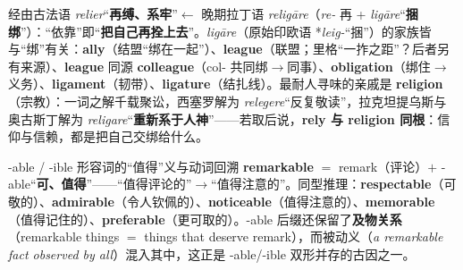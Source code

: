 \documentclass[../main.tex]{subfiles}
\begin{document}


\begin{origin}
经由古法语 \textit{relier}“\textbf{再缚、系牢}”$\leftarrow$ 晚期拉丁语 \textit{religāre}（\textit{re-} 再 + \textit{ligāre}“\textbf{捆绑}”）：“依靠”即“\textbf{把自己再拴上去}”。\textit{ligāre}（原始印欧语 *\textit{leig-}“捆”）的家族皆与“绑”有关：\textbf{ally}（结盟“绑在一起”）、\textbf{league}（联盟；里格“一拃之距”？后者另有来源）、\textbf{league} 同源 \textbf{colleague}（col- 共同绑$\to$同事）、\textbf{obligation}（绑住$\to$义务）、\textbf{ligament}（韧带）、\textbf{ligature}（结扎线）。最耐人寻味的亲戚是 \textbf{religion}（宗教）：一词之解千载聚讼，西塞罗解为 \textit{relegere}“反复敬读”，拉克坦提乌斯与奥古斯丁解为 \textit{religare}“\textbf{重新系于人神}”——若取后说，\textbf{rely 与 religion 同根}：信仰与信赖，都是把自己交绑给什么。
\end{origin}



\begin{gram}{-able / -ible 形容词的“值得”义与动词回溯}
\textbf{remarkable} $=$ remark（评论）$+$ -able“\textbf{可、值得}”——“值得评论的”$\to$“值得注意的”。同型推理：\textbf{respectable}（可敬的）、\textbf{admirable}（令人钦佩的）、\textbf{noticeable}（值得注意的）、\textbf{memorable}（值得记住的）、\textbf{preferable}（更可取的）。-able 后缀还保留了\textbf{及物关系}（remarkable things $=$ things that deserve remark），而被动义（\textit{a remarkable fact observed by all}）混入其中，这正是 -able/-ible 双形并存的古因之一。
\end{gram}
\end{document}
